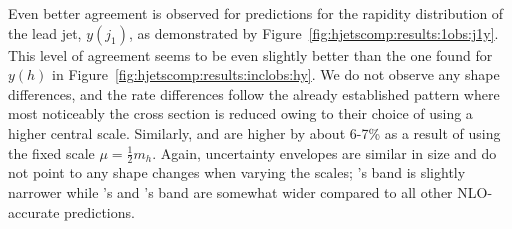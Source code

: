 Even better agreement is observed  for predictions for the rapidity distribution of the lead jet,
$y(j_1)$, as demonstrated by Figure~\ref{fig:hjetscomp:results:1obs:j1y}.
This level of agreement seems to be even slightly better than the one
found for $y(h)$ in Figure~\ref{fig:hjetscomp:results:inclobs:hy}.
We do not observe any shape differences, and the rate differences 
follow the already established pattern where most noticeably the
\MGaMC cross section is reduced owing to their choice of using a
higher central scale. Similarly, \Sherpa \NNLOPS and \Resbos are
higher by about 6-7\% as a result of using the fixed scale
$\mu=\tfrac{1}{2}m_h$. Again, uncertainty envelopes are similar in
size and do not point to any shape changes when varying the scales;
\Herwig's band is slightly narrower while \Sherpa \MEPSatNLO's and
\MGaMC's band are somewhat wider compared to all other NLO-accurate
predictions.

